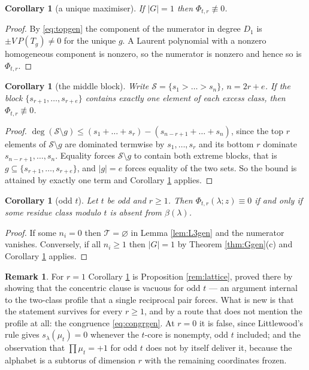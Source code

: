 \documentclass[11pt,reqno]{amsart}
\theoremstyle{plain}
\newtheorem{corollary}[theorem]{Corollary}
\theoremstyle{definition}
\newtheorem{remark}[theorem]{Remark}
\newcommand{\zt}{\mu_t}
\begin{document}
\begin{corollary}[a unique maximiser]\label{cor:uniquegen}
If $|G|=1$ then $\Phi_{t,r}\not\equiv0$.
\end{corollary}

\begin{proof}
By \eqref{eq:topgen} the component of the numerator in degree $D_1$ is $\pm V\,P(T_g)\ne0$ for the
unique $g$. A Laurent polynomial with a nonzero homogeneous component is nonzero, so the numerator
is nonzero and hence so is $\Phi_{t,r}$.
\end{proof}

\begin{corollary}[the middle block]\label{cor:midgen}
Write $\mathcal{S}=\{s_1>\dots>s_n\}$, $n=2r+e$. If the block $\{s_{r+1},\dots,s_{r+e}\}$ contains
exactly one element of each excess class, then $\Phi_{t,r}\not\equiv0$.
\end{corollary}

\begin{proof}
$\deg(\mathcal{S}\setminus g)\le(s_1+\dots+s_r)-(s_{n-r+1}+\dots+s_n)$, since the top $r$ elements
of $\mathcal{S}\setminus g$ are dominated termwise by $s_1,\dots,s_r$ and its bottom $r$ dominate
$s_{n-r+1},\dots,s_n$. Equality forces $\mathcal{S}\setminus g$ to contain both extreme blocks, that
is $g\subseteq\{s_{r+1},\dots,s_{r+e}\}$, and $|g|=e$ forces equality of the two sets. So the bound
is attained by exactly one term and Corollary \ref{cor:uniquegen} applies.
\end{proof}

\begin{corollary}[odd $t$]\label{cor:oddgen}
Let $t$ be odd and $r\ge1$. Then $\Phi_{t,r}(\lambda;z)\equiv0$ if and only if some residue class
modulo $t$ is absent from $\beta(\lambda)$.
\end{corollary}

\begin{proof}
If some $n_i=0$ then $\mathcal T=\varnothing$ in Lemma \ref{lem:L3gen} and the numerator vanishes.
Conversely, if all $n_i\ge1$ then $|G|=1$ by Theorem \ref{thm:Ggen}(c) and Corollary
\ref{cor:uniquegen} applies.
\end{proof}

\begin{remark}
For $r=1$ Corollary \ref{cor:oddgen} is Proposition \ref{rem:lattice}, proved there by showing that
the concentric clause is vacuous for odd $t$ --- an argument internal to the two-class profile that a
single reciprocal pair forces. What is new is that the statement survives for every $r\ge1$, and by
a route that does not mention the profile at all: the congruence \eqref{eq:congrgen}. At $r=0$ it is
false, since Littlewood's rule gives $s_\lambda(\zt)=0$ whenever the $t$-core is nonempty, odd $t$
included; and the observation that $\prod\zt=+1$ for odd $t$ does not by itself deliver it, because
the alphabet is a subtorus of dimension $r$ with the remaining coordinates frozen.
\end{remark}
\end{document}
